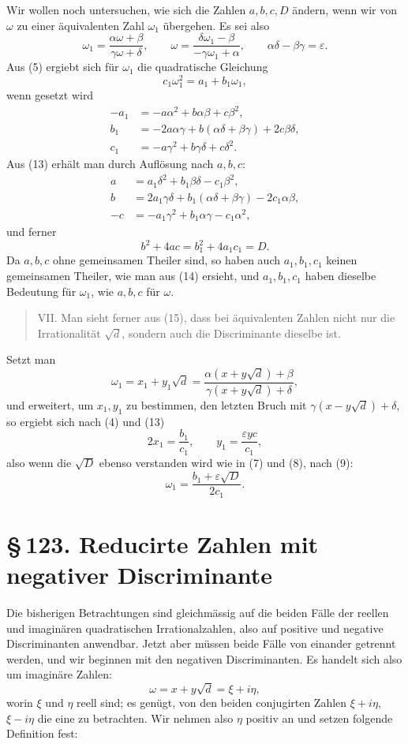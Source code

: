 \documentclass[11pt]{article}
\providecommand{\sect}[2]{\section*{\S\,#1. #2}}
\begin{document}
Wir wollen noch untersuchen, wie sich die Zahlen $a,b,c,D$ ändern, wenn wir von $\omega$ zu einer äquivalenten Zahl $\omega_1$ übergehen. Es sei also
\[
\tag{11}       \omega_1=\frac{\alpha\omega+\beta}{\gamma\omega+\delta},
        \qquad
        \omega=\frac{\delta\omega_1-\beta}{-\gamma\omega_1+\alpha},
        \qquad
        \alpha\delta-\beta\gamma=\varepsilon.
\]
Aus (5) ergiebt sich für $\omega_1$ die quadratische Gleichung
\[
\tag{12}       c_1\omega_1^2=a_1+b_1\omega_1,
\]
wenn gesetzt wird
\[
\tag{13}\begin{aligned}
-a_1&=-a\alpha^2+b\alpha\beta+c\beta^2,\\
 b_1&=-2a\alpha\gamma+b(\alpha\delta+\beta\gamma)+2c\beta\delta,\\
 c_1&=-a\gamma^2+b\gamma\delta+c\delta^2.
\end{aligned}
\]
Aus (13) erhält man durch Auflösung nach $a,b,c$:
\[
\tag{14}\begin{aligned}
 a&=a_1\delta^2+b_1\beta\delta-c_1\beta^2,\\
 b&=2a_1\gamma\delta+b_1(\alpha\delta+\beta\gamma)-2c_1\alpha\beta,\\
-c&=-a_1\gamma^2+b_1\alpha\gamma-c_1\alpha^2,
\end{aligned}
\]
und ferner
\[
\tag{15}       b^2+4ac=b_1^2+4a_1c_1=D.
\]
Da $a,b,c$ ohne gemeinsamen Theiler sind, so haben auch $a_1,b_1,c_1$ keinen gemeinsamen Theiler, wie man aus (14) ersieht, und $a_1,b_1,c_1$ haben dieselbe Bedeutung für $\omega_1$, wie $a,b,c$ für $\omega$.

\begin{quote}
VII. Man sieht ferner aus (15), dass bei äquivalenten Zahlen nicht nur die Irrationalität $\sqrt d$, sondern auch die Discriminante dieselbe ist.
\end{quote}

Setzt man
\[
\tag{16}       \omega_1=x_1+y_1\sqrt d
       =\frac{\alpha(x+y\sqrt d)+\beta}{\gamma(x+y\sqrt d)+\delta},
\]
und erweitert, um $x_1,y_1$ zu bestimmen, den letzten Bruch mit $\gamma(x-y\sqrt d)+\delta$, so ergiebt sich nach (4) und (13)
\[
\tag{17}       2x_1=\frac{b_1}{c_1},
       \qquad
       y_1=\frac{\varepsilon yc}{c_1},
\]
also wenn die $\sqrt D$ ebenso verstanden wird wie in (7) und (8), nach (9):
\[
\tag{18}       \omega_1=\frac{b_1+\varepsilon\sqrt D}{2c_1}.
\]

\sect{123}{Reducirte Zahlen mit negativer Discriminante}

Die bisherigen Betrachtungen sind gleichmässig auf die beiden Fälle der reellen und imaginären quadratischen Irrationalzahlen, also auf positive und negative Discriminanten anwendbar. Jetzt aber müssen beide Fälle von einander getrennt werden, und wir beginnen mit den negativen Discriminanten. Es handelt sich also um imaginäre Zahlen:
\[
\tag{1}        \omega=x+y\sqrt d=\xi+i\eta,
\]
worin $\xi$ und $\eta$ reell sind; es genügt, von den beiden conjugirten Zahlen $\xi+i\eta$, $\xi-i\eta$ die eine zu betrachten. Wir nehmen also $\eta$ positiv an und setzen folgende Definition fest:
\end{document}

